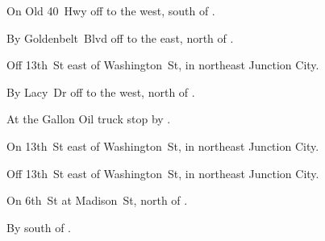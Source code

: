 

\begin{LocationList}

On Old 40~Hwy off  to the west, south of .

By Goldenbelt~Blvd off   to the east, north of .

Off 13th~St east of  Washington~St, in northeast Junction City.

By Lacy~Dr off   to the west, north of .

At the Gallon Oil truck stop by  .

On 13th~St east of  Washington~St, in northeast Junction City.

Off 13th~St east of  Washington~St, in northeast Junction City.

On 6th~St at Madison~St, north of .

By  south of .

\end{LocationList}
